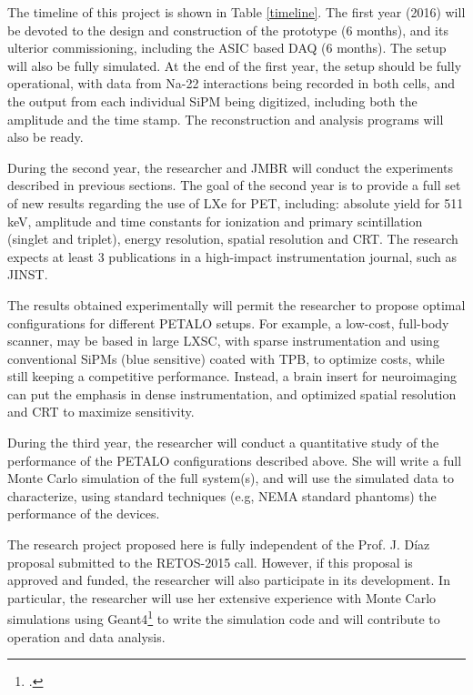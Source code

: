 The timeline of this project is shown in Table \ref{timeline}. The first year (2016) will be devoted to the design and construction of the prototype (6 months), and its ulterior commissioning, including the ASIC based DAQ (6 months). The setup will also be fully simulated. At the end of the first year, the setup should be fully operational, with data from Na-22 interactions being recorded in both cells, and the output from each individual SiPM being digitized, including both the amplitude and the time stamp. The reconstruction and analysis programs will also be ready.

During the second year, the researcher and JMBR will conduct the experiments described in previous sections. The goal of the second year is to provide a full set of new results regarding the use of LXe for PET, including: absolute yield for 511 keV, amplitude and time constants for ionization and primary scintillation (singlet and triplet), energy resolution, spatial resolution and CRT. The research expects at least 3 publications in a high-impact instrumentation journal, such as JINST. 

The results obtained experimentally will permit the researcher to propose optimal configurations for different PETALO setups. For example, a low-cost, full-body scanner, may be based in large LXSC, with sparse instrumentation and using conventional SiPMs (blue sensitive) coated with TPB, to optimize costs, while still keeping a competitive performance. Instead, a brain insert for neuroimaging can put the emphasis in dense instrumentation, and optimized spatial resolution and CRT to maximize sensitivity. 

During the third year, the researcher will conduct a quantitative study of the performance of the PETALO configurations described above. She will write a full Monte Carlo simulation of the full system(s), and will use the simulated data to characterize, using standard techniques (e.g, NEMA standard phantoms) the performance of the devices. 

The research project proposed here is fully independent of the Prof. J. D\'iaz proposal submitted to the RETOS-2015 call. However, if this proposal is approved and funded, the researcher will also participate in its development. In particular, the researcher will use her extensive experience with Monte Carlo simulations using Geant4\footcite{Agostinelli:2002hh} to write the simulation code and will contribute to operation and data analysis. 

